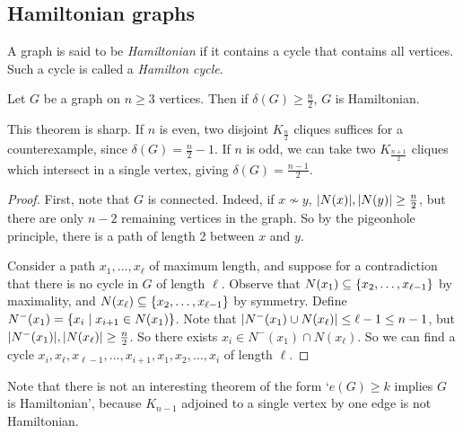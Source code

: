 \subsection{Hamiltonian graphs}
\begin{definition}
	A graph is said to be \emph{Hamiltonian} if it contains a cycle that contains all vertices.
	Such a cycle is called a \emph{Hamilton cycle}.
\end{definition}
\begin{theorem}
	Let \( G \) be a graph on \( n \geq 3 \) vertices.
	Then if \( \delta(G) \geq \frac{n}{2} \), \( G \) is Hamiltonian.
\end{theorem}
\begin{remark}
	This theorem is sharp.
	If \( n \) is even, two disjoint \( K_{\frac{n}{2}} \) cliques suffices for a counterexample, since \( \delta(G) = \frac{n}{2} - 1 \).
	If \( n \) is odd, we can take two \( K_{\frac{n+1}{2}} \) cliques which intersect in a single vertex, giving \( \delta(G) = \frac{n-1}{2} \).
\end{remark}
\begin{proof}
	First, note that \( G \) is connected.
	Indeed, if \( x \not\sim y \), \( \abs{N(x)}, \abs{N(y)} \geq \frac{n}{2} \), but there are only \( n - 2 \) remaining vertices in the graph.
	So by the pigeonhole principle, there is a path of length 2 between \( x \) and \( y \).

	Consider a path \( x_1, \dots, x_\ell \) of maximum length, and suppose for a contradiction that there is no cycle in \( G \) of length \( \ell \).
	Observe that \( N(x_1) \subseteq \qty{x_2, \dots, x_{\ell - 1}} \) by maximality, and \( N(x_\ell) \subseteq \qty{x_2, \dots, x_{\ell - 1}} \) by symmetry.
	Define \( N^-(x_1) = \qty{x_i \mid x_{i+1} \in N(x_1)} \).
	Note that \( \abs{N^-(x_1) \cup N(x_\ell)} \leq \ell - 1 \leq n - 1 \), but \( \abs{N^-(x_1)}, \abs{N(x_\ell)} \geq \frac{n}{2} \).
	So there exists \( x_i \in N^-(x_1) \cap N(x_\ell) \).
	So we can find a cycle \( x_i, x_\ell, x_{\ell-1}, \dots, x_{i+1}, x_1, x_2, \dots, x_i \) of length \( \ell \).
\end{proof}
\begin{remark}
	Note that there is not an interesting theorem of the form `\( e(G) \geq k \) implies \( G \) is Hamiltonian', because \( K_{n-1} \) adjoined to a single vertex by one edge is not Hamiltonian.
\end{remark}

